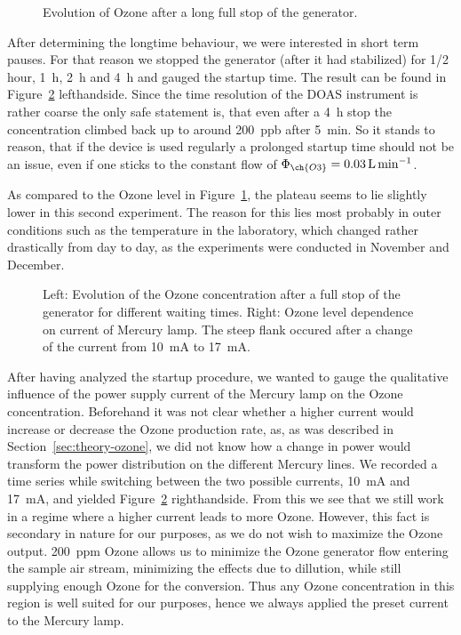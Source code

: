 \begin{figure}[htbp]
  \centering
  
  \caption{Evolution of Ozone after a long full stop of the
    generator.}
  \label{fig:long-stop}
\end{figure}

After determining the longtime behaviour, we were interested in
short term pauses. For that reason we stopped the generator (after it
had stabilized) for {\nfrac{} 1/2} \si{hour}, \SI{1}{\hour},
\SI{2}{\hour} and \SI{4}{\hour} and gauged the startup time. The
result can be found in Figure~\ref{fig:multiple-stop}
lefthandside. Since the time resolution of the DOAS instrument is
rather coarse the only safe statement is, that even after a
\SI{4}{\hour} stop the concentration climbed back up to around
\SI{200}{ppb} after \SI{5}{\minute}. So it stands to reason, that if
the device is used regularly a prolonged startup time should not be an
issue, even if one sticks to the constant flow of $\Phi_{\ch{O3}} =
\SI{0.03}{\liter\per\minute}$.

As compared to the Ozone level in Figure~\ref{fig:long-stop}, the
plateau seems to lie slightly lower in this second experiment. The
reason for this lies most probably in outer conditions such as the
temperature in the laboratory, which changed rather drastically from
day to day, as the experiments were conducted in November and
December.

\begin{figure}[htbp]
  \centering
  
  \hfill
  
  \caption{Left: Evolution of the Ozone concentration after a full stop of the
    generator for different waiting times. Right: Ozone level
    dependence on current of Mercury lamp. The steep
    flank occured after a change of the current from
    \SI{10}{\milli\ampere} to \SI{17}{\milli\ampere}.}
  \label{fig:multiple-stop}
\end{figure}

After having analyzed the startup procedure, we wanted to gauge the
qualitative influence of the power supply current of the Mercury lamp
on the Ozone concentration. Beforehand it was not clear whether a
higher current would increase or decrease the Ozone production rate,
as, as was described in Section~\ref{sec:theory-ozone}, we did not
know how a change in power would transform the power distribution on
the different Mercury lines. We recorded a time series while switching
between the two possible currents, \SI{10}{\milli\ampere} and
\SI{17}{\milli\ampere}, and yielded Figure~\ref{fig:multiple-stop}
righthandside. From this we see that we still work in a regime where a
higher current leads to more Ozone. However, this fact is secondary in
nature for our purposes, as we do not wish to maximize the Ozone
output. \SI{200}{ppm} Ozone allows us to minimize the Ozone generator
flow entering the sample air stream, minimizing the effects due to
dillution, while still supplying enough Ozone for the conversion. Thus
any Ozone concentration in this region is well suited for our
purposes, hence we always applied the preset current to the Mercury
lamp. 

